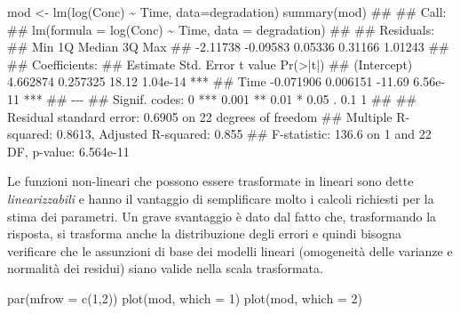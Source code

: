 \documentclass[a4paper,12pt,oneside]{book}
\newenvironment{Shaded}{\begin{snugshade}}{\end{snugshade}}
\newcommand{\DecValTok}[1]{#1}
\newcommand{\SpecialCharTok}[1]{#1}
\newcommand{\DocumentationTok}[1]{#1}
\newcommand{\OtherTok}[1]{#1}
\newcommand{\FunctionTok}[1]{#1}
\newcommand{\AttributeTok}[1]{#1}
\newcommand{\NormalTok}[1]{#1}
\begin{document}
\begin{Shaded}
\begin{Highlighting}[]
\NormalTok{mod }\OtherTok{\textless{}{-}} \FunctionTok{lm}\NormalTok{(}\FunctionTok{log}\NormalTok{(Conc) }\SpecialCharTok{\textasciitilde{}}\NormalTok{ Time, }\AttributeTok{data=}\NormalTok{degradation)}
\FunctionTok{summary}\NormalTok{(mod)}
\DocumentationTok{\#\# }
\DocumentationTok{\#\# Call:}
\DocumentationTok{\#\# lm(formula = log(Conc) \textasciitilde{} Time, data = degradation)}
\DocumentationTok{\#\# }
\DocumentationTok{\#\# Residuals:}
\DocumentationTok{\#\#      Min       1Q   Median       3Q      Max }
\DocumentationTok{\#\# {-}2.11738 {-}0.09583  0.05336  0.31166  1.01243 }
\DocumentationTok{\#\# }
\DocumentationTok{\#\# Coefficients:}
\DocumentationTok{\#\#              Estimate Std. Error t value Pr(\textgreater{}|t|)    }
\DocumentationTok{\#\# (Intercept)  4.662874   0.257325   18.12 1.04e{-}14 ***}
\DocumentationTok{\#\# Time        {-}0.071906   0.006151  {-}11.69 6.56e{-}11 ***}
\DocumentationTok{\#\# {-}{-}{-}}
\DocumentationTok{\#\# Signif. codes:  0 \textquotesingle{}***\textquotesingle{} 0.001 \textquotesingle{}**\textquotesingle{} 0.01 \textquotesingle{}*\textquotesingle{} 0.05 \textquotesingle{}.\textquotesingle{} 0.1 \textquotesingle{} \textquotesingle{} 1}
\DocumentationTok{\#\# }
\DocumentationTok{\#\# Residual standard error: 0.6905 on 22 degrees of freedom}
\DocumentationTok{\#\# Multiple R{-}squared:  0.8613, Adjusted R{-}squared:  0.855 }
\DocumentationTok{\#\# F{-}statistic: 136.6 on 1 and 22 DF,  p{-}value: 6.564e{-}11}
\end{Highlighting}
\end{Shaded}

Le funzioni non-lineari che possono essere trasformate in lineari sono dette \emph{linearizzabili} e hanno il vantaggio di semplificare molto i calcoli richiesti per la stima dei parametri. Un grave svantaggio è dato dal fatto che, trasformando la risposta, si trasforma anche la distribuzione degli errori e quindi bisogna verificare che le assunzioni di base dei modelli lineari (omogeneità delle varianze e normalità dei residui) siano valide nella scala trasformata.

\begin{Shaded}
\begin{Highlighting}[]
\FunctionTok{par}\NormalTok{(}\AttributeTok{mfrow =} \FunctionTok{c}\NormalTok{(}\DecValTok{1}\NormalTok{,}\DecValTok{2}\NormalTok{))}
\FunctionTok{plot}\NormalTok{(mod, }\AttributeTok{which =} \DecValTok{1}\NormalTok{)}
\FunctionTok{plot}\NormalTok{(mod, }\AttributeTok{which =} \DecValTok{2}\NormalTok{)}
\end{Highlighting}
\end{Shaded}
\end{document}

